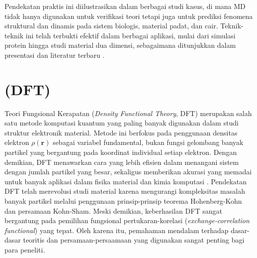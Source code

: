 Pendekatan praktis ini diilustrasikan dalam berbagai studi kasus, di mana MD tidak hanya digunakan untuk verifikasi teori tetapi juga untuk prediksi fenomena struktural dan dinamis pada sistem biologis, material padat, dan cair.
Teknik-teknik ini telah terbukti efektif dalam berbagai aplikasi, mulai dari simulasi protein hingga studi material dua dimensi, sebagaimana ditunjukkan dalam presentasi dan literatur terbaru \citep{Rapaport2004}.

\section{ (DFT)}
 Teori Fungsional Kerapatan (\emph{Density Functional Theory}, DFT) merupakan salah satu metode komputasi kuantum yang paling banyak digunakan dalam studi struktur elektronik material.
Metode ini berfokus pada penggunaan densitas elektron \(\rho(\mathbf{r})\) sebagai variabel fundamental, bukan fungsi gelombang banyak partikel yang bergantung pada koordinat individual setiap elektron.
Dengan demikian, DFT menawarkan cara yang lebih efisien dalam menangani sistem dengan jumlah partikel yang besar, sekaligus memberikan akurasi yang memadai untuk banyak aplikasi dalam fisika material dan kimia komputasi \citep{Kohn1965, Martin2004}.
Pendekatan DFT telah merevolusi studi material karena mengurangi kompleksitas masalah banyak partikel melalui penggunaan prinsip-prinsip teorema Hohenberg-Kohn dan persamaan Kohn-Sham.
Meski demikian, keberhasilan DFT sangat bergantung pada pemilihan fungsional pertukaran-korelasi (\emph{exchange-correlation functional}) yang tepat.
Oleh karena itu, pemahaman mendalam terhadap dasar-dasar teoritis dan persamaan-persaamaan yang digunakan sangat penting bagi para peneliti.

